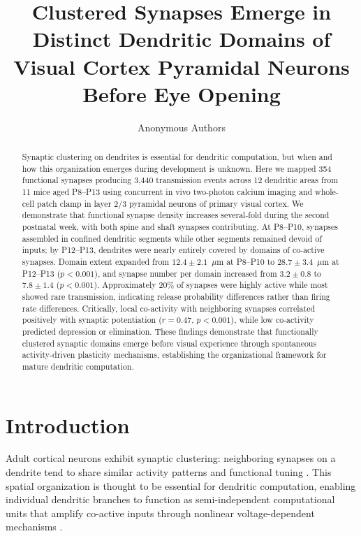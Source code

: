 \documentclass[11pt]{article}
\title{Clustered Synapses Emerge in Distinct Dendritic Domains of Visual Cortex Pyramidal Neurons Before Eye Opening}
\author{Anonymous Authors}
\date{}
\begin{document}
\maketitle

\begin{abstract}
Synaptic clustering on dendrites is essential for dendritic computation, but when and how this organization emerges during development is unknown. Here we mapped 354 functional synapses producing 3,440 transmission events across 12 dendritic areas from 11 mice aged P8--P13 using concurrent in vivo two-photon calcium imaging and whole-cell patch clamp in layer 2/3 pyramidal neurons of primary visual cortex. We demonstrate that functional synapse density increases several-fold during the second postnatal week, with both spine and shaft synapses contributing. At P8--P10, synapses assembled in confined dendritic segments while other segments remained devoid of inputs; by P12--P13, dendrites were nearly entirely covered by domains of co-active synapses. Domain extent expanded from $12.4 \pm 2.1$~$\mu$m at P8--P10 to $28.7 \pm 3.4$~$\mu$m at P12--P13 ($p < 0.001$), and synapse number per domain increased from $3.2 \pm 0.8$ to $7.8 \pm 1.4$ ($p < 0.001$). Approximately 20\% of synapses were highly active while most showed rare transmission, indicating release probability differences rather than firing rate differences. Critically, local co-activity with neighboring synapses correlated positively with synaptic potentiation ($r = 0.47$, $p < 0.001$), while low co-activity predicted depression or elimination. These findings demonstrate that functionally clustered synaptic domains emerge before visual experience through spontaneous activity-driven plasticity mechanisms, establishing the organizational framework for mature dendritic computation.
\end{abstract}

\section{Introduction}

Adult cortical neurons exhibit synaptic clustering: neighboring synapses on a dendrite tend to share similar activity patterns and functional tuning \citep{kleindienst2011activity, takahashi2012locally, wilson2016orientation, cossell2015functional}. This spatial organization is thought to be essential for dendritic computation, enabling individual dendritic branches to function as semi-independent computational units that amplify co-active inputs through nonlinear voltage-dependent mechanisms \citep{poirazi2003pyramidal, stuart2015dendritic, larkum2022dendrites}.
\end{document}
